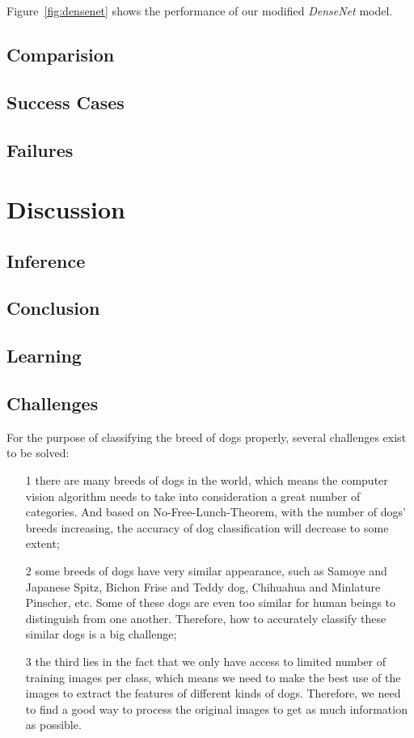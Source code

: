 \documentclass{article}
\begin{document}
Figure~\ref{fig:densenet} shows the performance of our modified \emph{DenseNet} model. 

\subsection{Comparision}

\subsection{Success Cases}
\subsection{Failures}

\newpage
\section{Discussion}

\subsection{Inference}
\subsection{Conclusion}
\subsection{Learning}
\subsection{Challenges}
For the purpose of classifying the breed of dogs properly, several challenges exist to be solved: 
\begin{itemize}
	\item[1] there are many breeds of dogs in the world, which means the computer vision algorithm needs to take into consideration a great number of categories. And based on No-Free-Lunch-Theorem, with the number of dogs' breeds increasing, the accuracy of dog classification will decrease to some extent; 
	\item[2] some breeds of dogs have very similar appearance, such as Samoye and Japanese Spitz, Bichon Frise and Teddy dog, Chihuahua and Minlature Pinscher, etc. Some of these dogs are even too similar for human beings to distinguish from one another. Therefore, how to accurately classify these similar dogs is a big challenge; 
	\item[3] the third lies in the fact that we only have access to limited number of training images per class, which means we need to make the best use of the images to extract the features of different kinds of dogs. Therefore, we need to find a good way to process the original images to get as much information as possible. 
\end{itemize}
\end{document}

